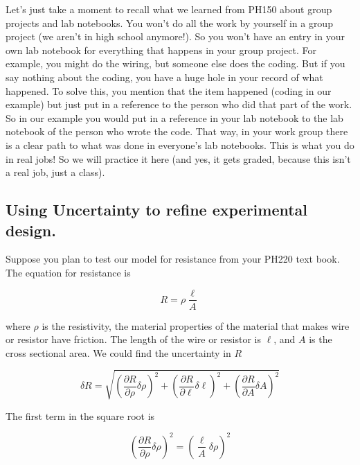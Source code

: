 Let's just take a moment to recall what we learned from PH150 about group projects and lab notebooks.  You won't do all the work by yourself in a group project (we aren't in high school anymore!).  So you won't have an entry in your own lab notebook for everything that happens in your group project. For example, you might do the wiring, but someone else does the coding.  But if you say nothing about the coding, you have a huge hole in your record of what happened.  To solve this, you mention that the item happened (coding in our example) but just put in a reference to the person who did that part of the work.  So in our example you would put in a reference in your lab notebook to the lab notebook of the person who wrote the code.  That way, in your work group there is a clear path to what was done in everyone's lab notebooks.  This is what you do in real jobs!  So we will practice it here (and yes, it gets graded, because this isn't a real job, just a class).

\subsection{Using Uncertainty to refine experimental design.}

Suppose you plan to test our model for resistance from your PH220 text book. The equation for resistance is 

\begin{equation*}
	R=\rho \frac{\ell }{A}
\end{equation*}

\noindent where $\rho $ is the resistivity, the material properties of the material that makes wire or resistor have friction. The length of the wire or resistor is $\ell $, and $A$ is the cross sectional area. We could find the uncertainty in $R$

\begin{equation*}
	\delta R=\sqrt{\left( \frac{\partial R}{\partial \rho }\delta \rho \right)
		^{2}+\left( \frac{\partial R}{\partial \ell }\delta \ell \right) ^{2}+\left( 
		\frac{\partial R}{\partial A}\delta A\right) ^{2}}
\end{equation*}

\noindent The first term in the square root is 

\begin{equation*}
	\left( \frac{\partial R}{\partial \rho }\delta \rho \right) ^{2}=\left( 
	\frac{\ell }{A}\delta \rho \right) ^{2}
\end{equation*}


